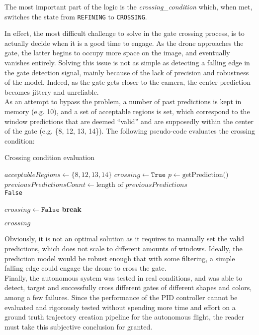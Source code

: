 The most important part of the logic is the \emph{crossing\_condition} which,
when met, switches the state from \texttt{REFINING} to \texttt{CROSSING}.

In effect, the most difficult challenge to solve in the gate crossing process,
is to actually decide when it is a good time to engage. As the drone
approaches the gate, the latter begins to occupy more space on the image, and
eventually vanishes entirely. Solving this issue is not as simple as detecting
a falling edge in the gate detection signal, mainly because of the lack of
precision and robustness of the model. Indeed, as the gate gets closer to the
camera, the center prediction becomes jittery and unreliable.\\

As an attempt to bypass the problem, a number of past predictions is kept in
memory (e.g. 10), and a set of acceptable regions is set, which correspond to
the window predictions that are deemed ``valid'' and are supposedly within the
center of the gate (e.g. \{8, 12, 13, 14\}). The following pseudo-code evaluates
the crossing condition:

\makeatletter
\def\BState{\State\hskip-\ALG@thistlm}
\makeatother

\begin{algorithm}
	\caption{Crossing condition evaluation}\label{alg:crosscond}
	\begin{algorithmic}[1]
			\State $\textit{acceptableRegions} \gets \{8, 12, 13, 14\}$
			\State $crossing \gets \texttt{True}$
			\State $p \gets \text{getPrediction()}$
			\State $previousPredictionsCount \gets \text{length of }
				\textit{previousPredictions}$
			~\\
				\Return \texttt{False}
			\EndIf

					\State $crossing \gets \texttt{False}$
					\State \textbf{break}
				\EndIf
			\EndFor

			\Return $\textit{crossing}$

		\EndProcedure
	\end{algorithmic}
\end{algorithm}

Obviously, it is not an optimal solution as it requires to manually set the
valid predictions, which does not scale to different amounts of windows.
Ideally, the prediction model would be robust enough that with some filtering,
a simple falling edge could engage the drone to cross the gate.\\

Finally, the autonomous system was tested in real conditions, and was
able to detect, target and successfully cross different gates of different
shapes and colors, among a few failures. Since the performance of the PID
controller cannot be evaluated and rigorously tested without spending more time
and effort on a ground truth trajectory creation pipeline for the autonomous
flight, the reader must take this subjective conclusion for granted.
